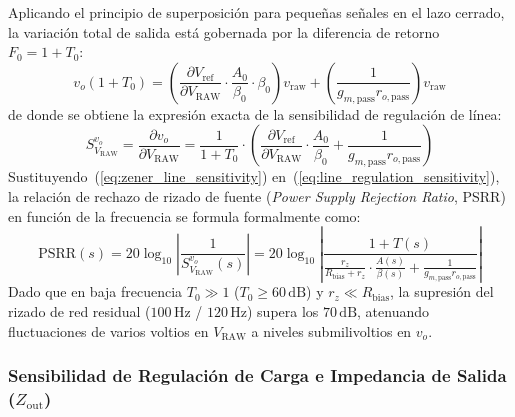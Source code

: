 Aplicando el principio de superposición para pequeñas señales en el lazo cerrado, la variación total de salida está gobernada por la diferencia de retorno $F_0 = 1 + T_0$:
\begin{equation}
    v_o (1 + T_0) = \left( \frac{\partial V_{\mathrm{ref}}}{\partial V_{\mathrm{RAW}}} \cdot \frac{A_0}{\beta_0} \cdot \beta_0 \right) v_{\mathrm{raw}} + \left( \frac{1}{g_{m,\mathrm{pass}} r_{o,\mathrm{pass}}} \right) v_{\mathrm{raw}}
\end{equation}
de donde se obtiene la expresión exacta de la sensibilidad de regulación de línea:
\begin{equation}
    S_{V_{\mathrm{RAW}}}^{v_o} = \frac{\partial v_o}{\partial V_{\mathrm{RAW}}} = \frac{1}{1 + T_0} \cdot \left( \frac{\partial V_{\mathrm{ref}}}{\partial V_{\mathrm{RAW}}} \cdot \frac{A_0}{\beta_0} + \frac{1}{g_{m,\mathrm{pass}} r_{o,\mathrm{pass}}} \right)
    \label{eq:line_regulation_sensitivity}
\end{equation}
Sustituyendo~(\ref{eq:zener_line_sensitivity}) en~(\ref{eq:line_regulation_sensitivity}), la relación de rechazo de rizado de fuente (\textit{Power Supply Rejection Ratio}, PSRR) en función de la frecuencia se formula formalmente como:
\begin{equation}
    \mathrm{PSRR}(s) = 20 \log_{10} \left| \frac{1}{S_{V_{\mathrm{RAW}}}^{v_o}(s)} \right| = 20 \log_{10} \left| \frac{1 + T(s)}{\frac{r_z}{R_{\mathrm{bias}} + r_z} \cdot \frac{A(s)}{\beta(s)} + \frac{1}{g_{m,\mathrm{pass}} r_{o,\mathrm{pass}}}} \right|
    \label{eq:psrr_transfer}
\end{equation}
Dado que en baja frecuencia $T_0 \gg 1$ ($T_0 \ge 60\,\mathrm{dB}$) y $r_z \ll R_{\mathrm{bias}}$, la supresión del rizado de red residual ($100\,\mathrm{Hz}$ / $120\,\mathrm{Hz}$) supera los $70\,\mathrm{dB}$, atenuando fluctuaciones de varios voltios en $V_{\mathrm{RAW}}$ a niveles submilivoltios en $v_o$.

\subsubsection{Sensibilidad de Regulación de Carga e Impedancia de Salida ($Z_{\mathrm{out}}$)}

